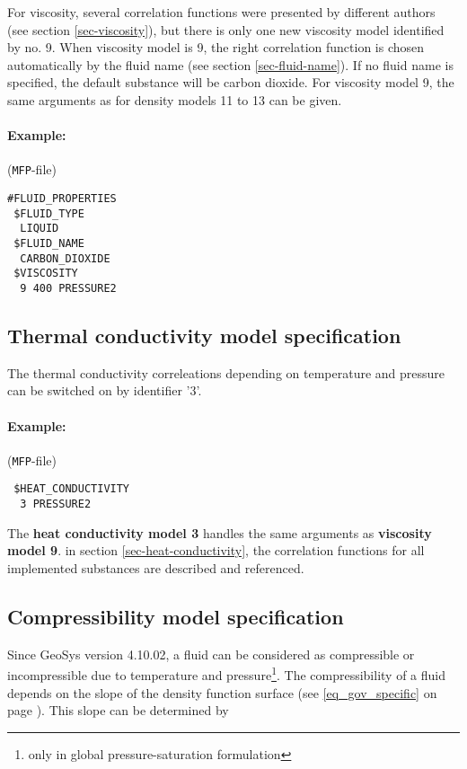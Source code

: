 For viscosity, several correlation functions were presented by different authors (see section \ref{sec-viscosity}), but there is only one new viscosity model identified by no. 9. When viscosity model is 9, the right correlation function is chosen automatically by the fluid name (see section \ref{sec-fluid-name}). If no fluid name is specified, the default substance will be carbon dioxide. For viscosity model 9, the same arguments as for density models 11 to 13 can be given.

\paragraph{Example:}
(\texttt{MFP}-file)
\begin{verbatim}
#FLUID_PROPERTIES
 $FLUID_TYPE
  LIQUID
 $FLUID_NAME
  CARBON_DIOXIDE
 $VISCOSITY
  9 400 PRESSURE2
\end{verbatim}
\subsection{Thermal conductivity model specification}

The thermal conductivity correleations depending on temperature and pressure can be switched on by identifier '3'.

\paragraph{Example:}
(\texttt{MFP}-file)
\begin{verbatim}
 $HEAT_CONDUCTIVITY
  3 PRESSURE2
\end{verbatim}
The \textbf{heat conductivity model 3} handles the same arguments as \textbf{viscosity model 9}. in section \ref{sec-heat-conductivity}, the correlation functions for all implemented substances are described and referenced.


\subsection{Compressibility model specification}

Since GeoSys version 4.10.02, a fluid can be considered as compressible or incompressible due to temperature and pressure\footnote{only in global pressure-saturation formulation}. The compressibility of a fluid depends on the slope of the density function surface (see \eqref{eq_gov_specific} on page \pageref{eq_gov_specific}). This slope can be determined by

